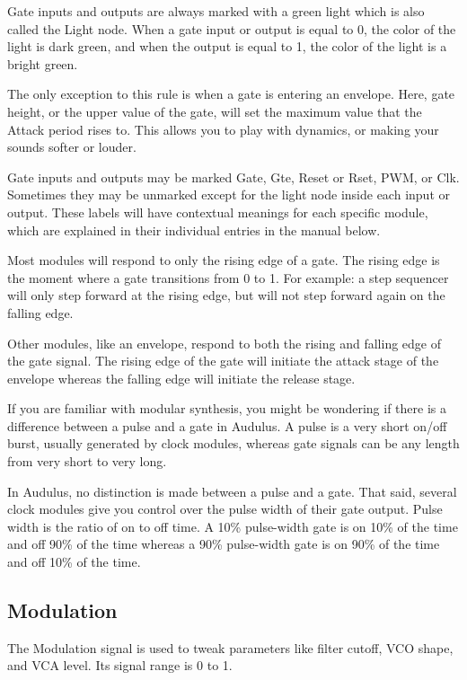 \documentclass[11pt]{book}
\begin{document}
Gate inputs and outputs are always marked with a green light which is also called the Light node. When a gate input or output is equal to 0, the color of the light is dark green, and when the output is equal to 1, the color of the light is a bright green.

The only exception to this rule is when a gate is entering an envelope. Here, gate height, or the upper value of the gate, will set the maximum value that the Attack period rises to. This allows you to play with dynamics, or making your sounds softer or louder.

Gate inputs and outputs may be marked Gate, Gte, Reset or Rset, PWM, or Clk. Sometimes they may be unmarked except for the light node inside each input or output. These labels will have contextual meanings for each specific module, which are explained in their individual entries in the manual below.

Most modules will respond to only the rising edge of a gate. The rising edge is the moment where a gate transitions from 0 to 1. For example: a step sequencer will only step forward at the rising edge, but will not step forward again on the falling edge.

Other modules, like an envelope, respond to both the rising and falling edge of the gate signal. The rising edge of the gate will initiate the attack stage of the envelope whereas the falling edge will initiate the release stage.

If you are familiar with modular synthesis, you might be wondering if there is a difference between a pulse and a gate in Audulus. A pulse is a very short on/off burst, usually generated by clock modules, whereas gate signals can be any length from very short to very long.

In Audulus, no distinction is made between a pulse and a gate. That said, several clock modules give you control over the pulse width of their gate output. Pulse width is the ratio of on to off time. A 10\% pulse-width gate is on 10\% of the time and off 90\% of the time whereas a 90\% pulse-width gate is on 90\% of the time and off 10\% of the time.

\subsection{Modulation}

The Modulation signal is used to tweak parameters like filter cutoff, VCO shape, and VCA level. Its signal range is 0 to 1. 
\end{document}
